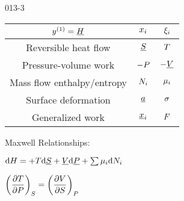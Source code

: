 \begin{mitframe}{013-3} %

    

\begin{longtable}{ | c | c | c | } 
 \hline
 	$ y^{(1)}= \uline{\enthalpy}$& $\conjcoor$ & $\conjcoortwo_{\state}$ \\ \hline
	Reversible heat flow & $\uline{\entropy}$ & $\Temp$ \\ \hline 
	Pressure-volume work & $-\p$ & $-\uline{\vol}$  \\ \hline
 	Mass flow enthalpy/entropy& $\nummoles_{\state}$ & $\chempot_{\state}$ \\ \hline   
	Surface deformation & $\totalsa$ & $\surftens$ \\ \hline   
    Generalized work & $\gendisp_{\state}$ & $\force$ \\ \hline
 
 
\end{longtable}

    
    
\begin{listone}
        
    \item Maxwell Relationships:
        
    \item $\mathrm{d}\enthalpy = +\Temp\mathrm{d}\uline{\entropy} + \uline{\vol}\mathrm{d}\uline{\p} + \sum\nolimits\chempot_{\state}\mathrm{d}\nummoles_{\state}$
         
    \item $\bigg(\dfrac{\partial\Temp}{\partial\p}\bigg)_{\entropy} = \bigg(\dfrac{\partial\vol}{\partial\entropy}\bigg)_{\p}$
    
    
\end{listone}			

\end{mitframe}